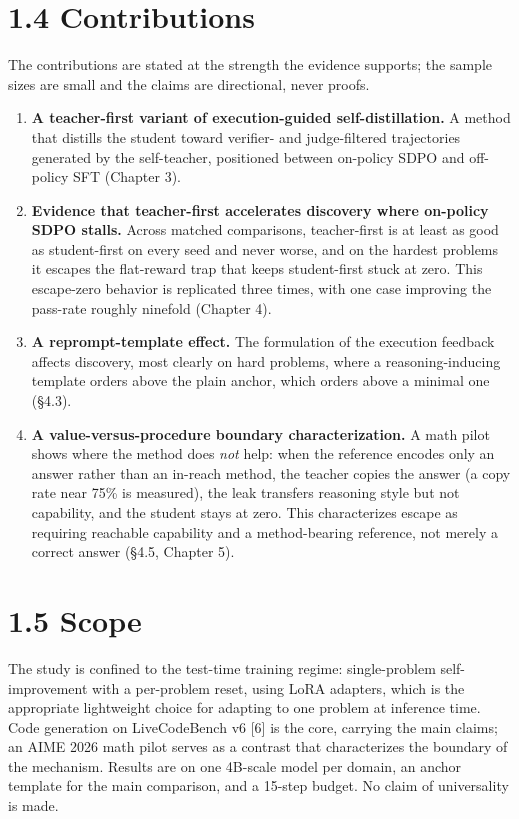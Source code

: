 \section{1.4 Contributions}\label{contributions}

The contributions are stated at the strength the evidence supports; the sample sizes are small and the claims are directional, never proofs.

\begin{enumerate}
\def\labelenumi{\arabic{enumi}.}
\tightlist
\item
  \textbf{A teacher-first variant of execution-guided self-distillation.} A method that distills the student toward verifier- and judge-filtered trajectories generated by the self-teacher, positioned between on-policy SDPO and off-policy SFT (Chapter 3).
\item
  \textbf{Evidence that teacher-first accelerates discovery where on-policy SDPO stalls.} Across matched comparisons, teacher-first is at least as good as student-first on every seed and never worse, and on the hardest problems it escapes the flat-reward trap that keeps student-first stuck at zero. This escape-zero behavior is replicated three times, with one case improving the pass-rate roughly ninefold (Chapter 4).
\item
  \textbf{A reprompt-template effect.} The formulation of the execution feedback affects discovery, most clearly on hard problems, where a reasoning-inducing template orders above the plain anchor, which orders above a minimal one (§4.3).
\item
  \textbf{A value-versus-procedure boundary characterization.} A math pilot shows where the method does \emph{not} help: when the reference encodes only an answer rather than an in-reach method, the teacher copies the answer (a copy rate near 75\% is measured), the leak transfers reasoning style but not capability, and the student stays at zero. This characterizes escape as requiring reachable capability and a method-bearing reference, not merely a correct answer (§4.5, Chapter 5).
\end{enumerate}

\section{1.5 Scope}\label{scope}

The study is confined to the test-time training regime: single-problem self-improvement with a per-problem reset, using LoRA adapters, which is the appropriate lightweight choice for adapting to one problem at inference time. Code generation on LiveCodeBench v6 {[}6{]} is the core, carrying the main claims; an AIME 2026 math pilot serves as a contrast that characterizes the boundary of the mechanism. Results are on one 4B-scale model per domain, an anchor template for the main comparison, and a 15-step budget. No claim of universality is made.

